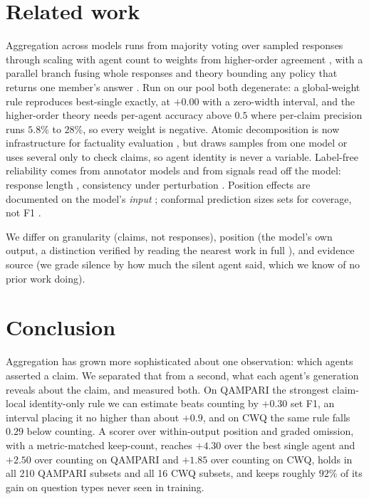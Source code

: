 \documentclass{article}
\begin{document}
\section{Related work}
\label{sec:related}

Aggregation across models runs from majority voting over sampled responses \cite{wang2022self} through scaling with agent count \cite{li2024agents} to weights from higher-order agreement \cite{ai2025majority}, with a parallel branch fusing whole responses \cite{jiang2023llm,chen2023universal} and theory bounding any policy that returns one member's answer \cite{ananthakrishnan2026power}. Run on our pool both degenerate: a global-weight rule reproduces best-single exactly, at $+0.00$ with a zero-width interval, %
and the higher-order theory needs per-agent accuracy above $0.5$ where per-claim precision runs $5.8\%$ to $28\%$, so every weight is negative. %
Atomic decomposition is now infrastructure for factuality evaluation \cite{thirukovalluru2024atomic,zhang2024atomic,ning2025mad,wan2025fastfact,liu2025verifact,goel2025zero,panou2025harnessing}, but draws samples from one model or uses several only to check claims, so agent identity is never a variable. Label-free reliability comes from annotator models \cite{dawid1979maximum,sinha2018fast,majdi2023crowd,kuzin2025improving} and from signals read off the model: response length \cite{janiak2025illusion,zhang2024verbosity}, consistency under perturbation \cite{wu2026this,ahn2025prompt}. Position effects are documented on the model's \emph{input} \cite{guo2024serial,zhang2026position,salvatore2025lost,qiao2026llm,yan2026evirank}; conformal prediction sizes sets for coverage, not F1 \cite{gauthier2025adaptive}.

We differ on granularity (claims, not responses), position (the model's own output, a distinction verified by reading the nearest work in full \cite{guo2024serial}), and evidence source (we grade silence by how much the silent agent said, which we know of no prior work doing).

\section{Conclusion}
\label{sec:conclusion}

Aggregation has grown more sophisticated about one observation: which agents asserted a claim. We separated that from a second, what each agent's generation reveals about the claim, and measured both. On QAMPARI the strongest claim-local identity-only rule we can estimate beats counting by $+0.30$ set F1, an interval placing it no higher than about $+0.9$, and on CWQ the same rule falls $0.29$ below counting. A scorer over within-output position and graded omission, with a metric-matched keep-count, reaches $+4.30$ over the best single agent and $+2.50$ over counting on QAMPARI and $+1.85$ over counting on CWQ, holds in all 210 QAMPARI subsets and all 16 CWQ subsets, and keeps roughly $92\%$ of its gain on question types never seen in training.
\end{document}
